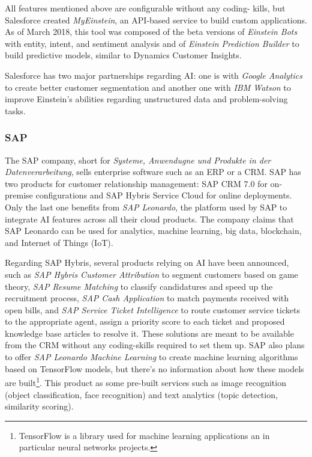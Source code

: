 All features mentioned above are configurable without any coding- kills, but Salesforce created \textit{MyEinstein}, an API-based service to build custom applications. As of March 2018, this tool was composed of the beta versions of \textit{Einstein Bots} with entity, intent, and sentiment analysis and of \textit{Einstein Prediction Builder} to build predictive models, similar to Dynamics Customer Insights.

Salesforce has two major partnerships regarding AI: one is with \textit{Google Analytics} to create better customer segmentation and another one with \textit{IBM Watson} to improve Einstein's abilities regarding unstructured data and problem-solving tasks.

\subsubsection*{SAP}
The SAP company, short for \textit{Systeme, Anwendugne und Produkte in der Datenverarbeitung}, sells enterprise software such as an ERP or a CRM. SAP has two products for customer relationship management: SAP CRM 7.0 for on-premise configurations and SAP Hybris Service Cloud for online deployments. Only the last one benefits from \textit{SAP Leonardo}, the platform used by SAP to integrate AI features across all their cloud products. The company claims that SAP Leonardo can be used for analytics, machine learning, big data, blockchain, and Internet of Things (IoT).

Regarding SAP Hybris, several products relying on AI have been announced, such as \textit{SAP Hybris Customer Attribution} to segment customers based on game theory, \textit{SAP Resume Matching} to classify candidatures and speed up the recruitment process, \textit{SAP Cash Application} to match payments received with open bills, and \textit{SAP Service Ticket Intelligence} to route customer service tickets to the appropriate agent, assign a priority score to each ticket and proposed knowledge base articles to resolve it. These solutions are meant to be available from the CRM without any coding-skills required to set them up. SAP also plans to offer \textit{SAP Leonardo Machine Learning} to create machine learning algorithms based on TensorFlow models, but there's no information about how these models are built\footnote{TensorFlow is a library used for machine learning applications an in particular neural networks projects.}. This product as some pre-built services such as image recognition (object classification, face recognition) and text analytics (topic detection, similarity scoring). 

